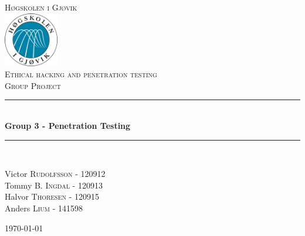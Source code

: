 \documentclass[12pt]{article} %
\begin{document}

\begin{titlepage}

\newcommand{\HRule}{\rule{\linewidth}{0.5mm}} %

\center %

\textsc{\LARGE Høgskolen i Gjøvik}\\[0.5cm] %
\includegraphics[width=90px, height=90px]{./Graphics/Hig-logo.png}\\[0.8cm] %
\textsc{\Large Ethical hacking and penetration testing}\\[0.5cm] %
\textsc{\large Group Project}\\[0.5cm] %

\HRule \\[0.4cm]
{ \huge \bfseries Group 3 - Penetration Testing}\\[0.4cm] %
\HRule \\[1.5cm]

\begin{minipage}{0.44\textwidth}
\begin{flushleft} \large
Victor \textsc{Rudolfsson} - 120912\\ %
Tommy \textsc{B. Ingdal} - 120913\\ %
Halvor \textsc{Thoresen} - 120915\\ %
Anders \textsc{Lium} - 141598\\ %
\end{flushleft}
\end{minipage}

\vfill %
{\large \today}\\[3cm] %

\end{titlepage}
\end{document}
